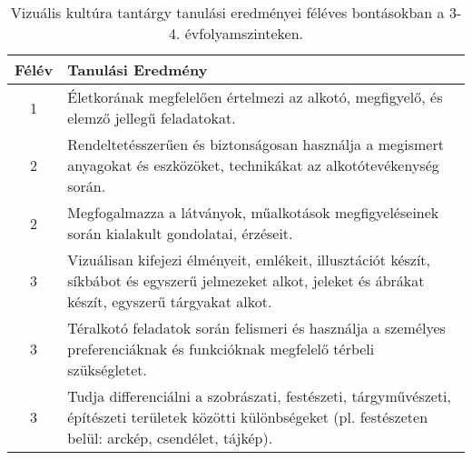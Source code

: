        
           \begin{longtable}{c | p{12cm} }
            \caption[Vizuális kultúra 3-4.]{Vizuális kultúra tantárgy tanulási eredményei féléves bontásokban a 3-4. évfolyamszinteken. }  \\

            \textbf{Félév} & \textbf{Tanulási Eredmény} \\
            \hline
            \endhead
                                
                                          1 &  Életkorának megfelelően értelmezi az alkotó, megfigyelő, és elemző jellegű feladatokat. \\ \hline
                                      
                                
                                          2 &  Rendeltetésszerűen és biztonságosan használja a megismert anyagokat és eszközöket, technikákat az alkotótevékenység során. \\ \hline
                                          2 &  Megfogalmazza a látványok, műalkotások megfigyeléseinek során kialakult gondolatai, érzéseit. \\ \hline
                                      
                                
                                          3 &  Vizuálisan kifejezi élményeit, emlékeit, illusztációt készít, síkbábot és egyszerű jelmezeket alkot, jeleket és ábrákat készít, egyszerű tárgyakat alkot. \\ \hline
                                          3 &  Téralkotó feladatok során felismeri és használja a személyes preferenciáknak és funkcióknak megfelelő térbeli szükségletet. \\ \hline
                                          3 &  Tudja  differenciálni a szobrászati, festészeti, tárgyművészeti, építészeti területek közötti különbségeket (pl. festészeten belül: arckép, csendélet, tájkép). \\ \hline
                                      

\end{longtable}

